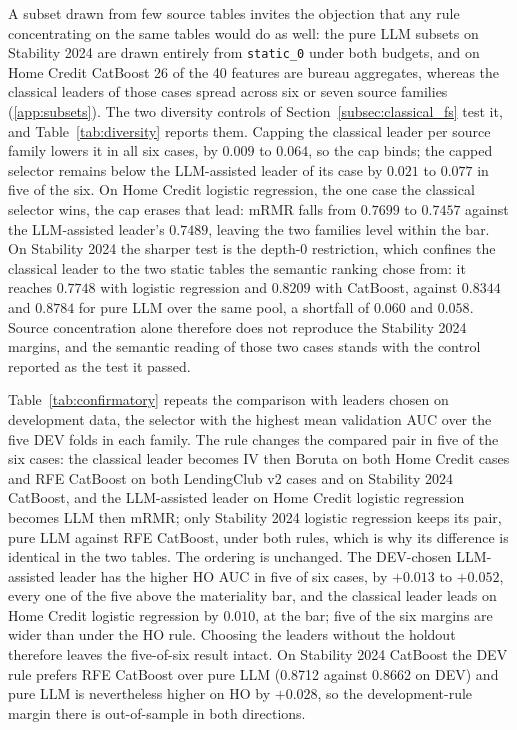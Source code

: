 \documentclass[final,5p,twocolumn]{elsarticle}
\begin{document}
A subset drawn from few source tables invites the objection that any rule concentrating on the same tables would do as well: the pure LLM subsets on Stability 2024 are drawn entirely from \texttt{static\_0} under both budgets, and on Home Credit CatBoost 26 of the 40 features are bureau aggregates, whereas the classical leaders of those cases spread across six or seven source families (\ref{app:subsets}). The two diversity controls of Section~\ref{subsec:classical_fs} test it, and Table~\ref{tab:diversity} reports them. Capping the classical leader per source family lowers it in all six cases, by $0.009$ to $0.064$, so the cap binds; the capped selector remains below the LLM-assisted leader of its case by $0.021$ to $0.077$ in five of the six. On Home Credit logistic regression, the one case the classical selector wins, the cap erases that lead: mRMR falls from $0.7699$ to $0.7457$ against the LLM-assisted leader's $0.7489$, leaving the two families level within the bar. On Stability 2024 the sharper test is the depth-0 restriction, which confines the classical leader to the two static tables the semantic ranking chose from: it reaches $0.7748$ with logistic regression and $0.8209$ with CatBoost, against $0.8344$ and $0.8784$ for pure LLM over the same pool, a shortfall of $0.060$ and $0.058$. Source concentration alone therefore does not reproduce the Stability 2024 margins, and the semantic reading of those two cases stands with the control reported as the test it passed.

Table~\ref{tab:confirmatory} repeats the comparison with leaders chosen on development data, the selector with the highest mean validation AUC over the five DEV folds in each family. The rule changes the compared pair in five of the six cases: the classical leader becomes IV then Boruta on both Home Credit cases and RFE CatBoost on both LendingClub v2 cases and on Stability 2024 CatBoost, and the LLM-assisted leader on Home Credit logistic regression becomes LLM then mRMR; only Stability 2024 logistic regression keeps its pair, pure LLM against RFE CatBoost, under both rules, which is why its difference is identical in the two tables. The ordering is unchanged. The DEV-chosen LLM-assisted leader has the higher HO AUC in five of six cases, by $+0.013$ to $+0.052$, every one of the five above the materiality bar, and the classical leader leads on Home Credit logistic regression by $0.010$, at the bar; five of the six margins are wider than under the HO rule. Choosing the leaders without the holdout therefore leaves the five-of-six result intact. On Stability 2024 CatBoost the DEV rule prefers RFE CatBoost over pure LLM (0.8712 against 0.8662 on DEV) and pure LLM is nevertheless higher on HO by $+0.028$, so the development-rule margin there is out-of-sample in both directions.
\end{document}

